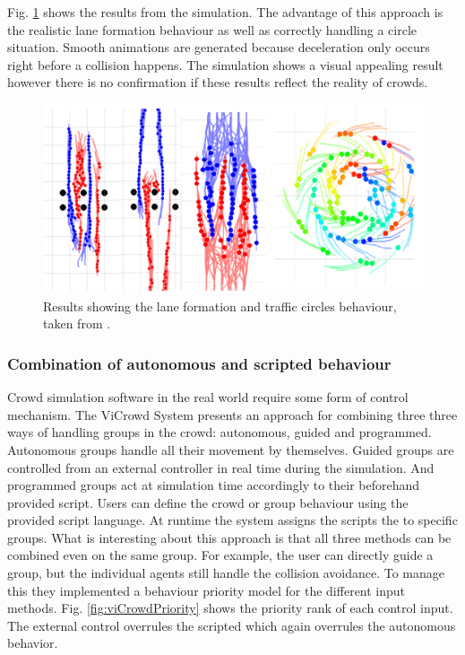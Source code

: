 \documentclass{acmsiggraph}               %
\begin{document}
Fig. \ref{fig:visualResults} shows the results from the simulation. The advantage of this approach is the realistic lane formation behaviour as well as correctly handling a circle situation. Smooth animations are generated because deceleration only occurs right before a collision happens. The simulation shows a visual appealing result however there is no confirmation if these results reflect the reality of crowds.

\begin{figure}[h]
  \centering
  \includegraphics[width=1\linewidth]{images/visualApproach-results.png}
  \caption{Results showing the lane formation and traffic circles behaviour, taken from \protect\cite{ondrej_synthetic-vision_2010}.}
  \label{fig:visualResults}
\end{figure}


\subsubsection{Combination of autonomous and scripted behaviour}

Crowd simulation software in the real world require some form of control mechanism. The ViCrowd System presents an approach for combining three three ways of handling groups in the crowd: autonomous, guided and programmed. 
Autonomous groups handle all their movement by themselves. Guided groups are controlled from an external controller in real time during the simulation. And programmed groups act at simulation time accordingly to their beforehand provided script. Users can define the crowd or group behaviour using the provided script language. At runtime the system assigns the scripts the to specific groups. 
What is interesting about this approach is that all three methods can be combined even on the same group. For example, the user can directly guide a group, but the individual agents still handle the collision avoidance. To manage this they implemented a behaviour priority model for the different input methods. Fig. \ref{fig:viCrowdPriority} shows the priority rank of each control input. The external control overrules the scripted which again overrules the autonomous behavior.
\end{document}
